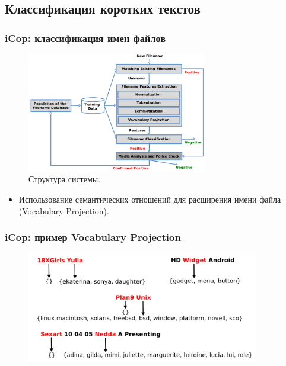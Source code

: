 \documentclass{beamer}
\begin{document}
\subsection{Классификация коротких текстов}

\begin{frame}[fragile]
\frametitle{iCop: классификация имен файлов}

\begin{figure}
\center
\includegraphics[width=0.7\textwidth]{./icop}
\caption{Структура системы.}
\end{figure}

\begin{itemize}
  \item Использование семантических отношений для расширения имени файла
  (Vocabulary Projection).
\end{itemize}


\end{frame}


\begin{frame}[fragile]
\frametitle{iCop: пример Vocabulary Projection}

\begin{figure}
\center
\includegraphics[width=0.9\textwidth]{./vp-ex}
\end{figure}



\end{frame}
\end{document}
